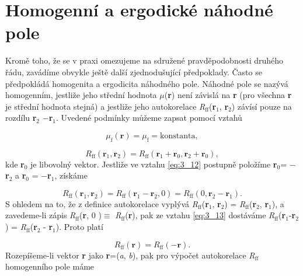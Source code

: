 \section*{Homogenní a ergodické náhodné pole}

Kromě toho, že se v praxi omezujeme na sdružené pravděpodobnosti druhého řádu, zavádíme obvykle ještě další zjednodušující předpoklady. Často se předpokládá homogenita a ergodicita náhodného pole. Náhodné pole se nazývá homogenním, jestliže jeho střední hodnota $\mu$(\textbf{r}) není závislá na \textbf{r} (pro všechna \textbf{r} je střední hodnota stejná) a jestliže jeho autokorelace \textit{R}$_{\mathrm{ff}}$(\textbf{r}$_1$, \textbf{r}$_2$) závísí pouze na rozdílu \textbf{r}$_2$ $-$\textbf{r}$_1$. Uvedené podmínky můžeme zapsat pomocí vztahů

\begin{equation} \label{eq:3_11}
    \mu_{\mathrm{f}}(\mathbf{r}) = \mu_{\mathrm{f}} = \mathrm{konstanta},
\end{equation}

\begin{equation} \label{eq:3_12}
    R_{\mathrm{ff}}(\mathbf{r}_1, \mathbf{r}_2) = R_{\mathrm{ff}}(\mathbf{r}_1 + \mathbf{r}_0, \mathbf{r}_2 + \mathbf{r}_0),
\end{equation}
kde \textbf{r}$_0$ je libovolný vektor. Jestliže ve vztahu \eqref{eq:3_12} postupně položíme \textbf{r}$_0$= $-$\textbf{r}$_2$ a \textbf{r}$_0$ = $-$\textbf{r}$_1$, získáme

\begin{equation} \label{eq:3_13}
    R_{\mathrm{ff}}(\mathbf{r}_1, \mathbf{r}_2) = R_{\mathrm{ff}}(\textbf{r}_1 - \mathbf{r}_2, 0) = R_{\mathrm{ff}}(0, \mathbf{r}_2 - \mathbf{r}_1).
\end{equation}
S ohledem na to, že z definice autokorelace vyplývá \textit{R}$_{\mathrm{ff}}$(\textbf{r}$_1$, \textbf{r}$_2$) = \textit{R}$_{\mathrm{ff}}$(\textbf{r}$_2$, \textbf{r}$_1$), a zavedeme-li zápis  \textit{R}$_{\mathrm{ff}}$(\textbf{r}, 0 )$\equiv$ \textit{R}$_{\mathrm{ff}}$(\textbf{r}), pak ze vztahu \eqref{eq:3_13} dostáváme \textit{R}$_{\mathrm{ff}}$(\textbf{r}$_1$-\textbf{r}$_2$) = \textit{R}$_{\mathrm{ff}}$(\textbf{r}$_2$ - \textbf{r}$_1$). Proto platí

\begin{equation} \label{eq:3_14}
    R_{\mathrm{ff}}(\mathbf{r}) = R_{\mathrm{ff}}(- \mathbf{r}).
\end{equation}
Rozepíšeme-li vektor \textbf{r} jako \textbf{r}=(\textit{a}, \textit{b}), pak pro výpočet autokorelace \textit{R}$_{\mathrm{ff}}$ homogenního pole máme

